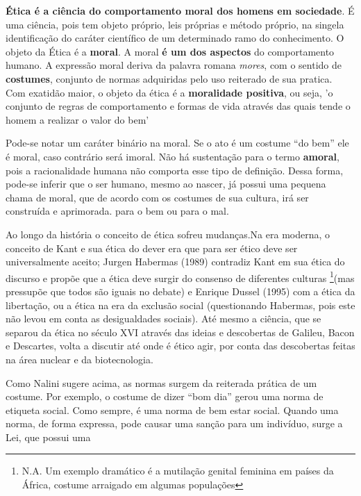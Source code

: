 \documentclass[
	12pt,				%
	openright,			%
	twoside,			%
	a4paper,			%
	chapter=TITLE,		%
	section=TITLE,		%
	subsection=TITLE,	%
	subsubsection=TITLE,%
	spanish,            %
	english,			%
	brazil				%
	]{abntex2}
\begin{document}
\begin{citacao}
	\textbf{Ética é a ciência do comportamento moral dos homens em sociedade}. É uma ciência, pois
	tem objeto próprio, leis próprias e método próprio, na singela identificação do caráter científico de
	um determinado ramo do conhecimento. O objeto da Ética é a \textbf{moral}. A moral \textbf{é um dos aspectos}
	do comportamento humano. A expressão moral deriva da palavra romana \textit{mores}, com o sentido de
	\textbf{costumes}, conjunto de normas adquiridas pelo uso reiterado de sua pratica.\\
	Com exatidão maior, o objeto da ética é a \textbf{moralidade positiva}, ou seja, 'o conjunto de
	regras de comportamento e formas de vida através das quais tende o homem a realizar o valor do bem'\cite[p. ~19, grifos do autor]{Nalini}
\end{citacao}
\par
Pode-se notar um caráter binário na moral. Se o ato é um costume “do bem” ele é moral, caso contrário será imoral. Não há sustentação para o termo \textbf{amoral}, pois a racionalidade humana não comporta
esse tipo de definição. Dessa forma, pode-se inferir que o ser humano, mesmo ao nascer, já possui uma pequena chama de moral, que de acordo com os costumes de sua cultura, irá ser construída e aprimorada. para o bem ou para o mal.
\par
Ao longo da história o conceito de ética sofreu mudanças.Na era moderna, o conceito de Kant e sua ética do dever era que para ser ético deve ser universalmente aceito; Jurgen Habermas (1989) contradiz Kant em sua ética do discurso e propõe que a ética deve surgir do consenso de diferentes culturas \footnote{N.A. Um exemplo dramático é a mutilação genital feminina em países da África, costume arraigado em algumas populações}(mas pressupõe que todos são iguais no debate) e Enrique Dussel (1995) com a ética da libertação, ou a ética na era da exclusão social (questionando Habermas, pois este não levou em conta as desigualdades sociais). Até mesmo a ciência, que se separou da ética no século XVI através das ideias e descobertas de Galileu, Bacon e Descartes, volta a discutir até onde é ético agir, por conta das descobertas feitas na área nuclear e da biotecnologia.
\par
Como Nalini sugere acima, as normas surgem da reiterada prática de um costume. Por exemplo, o costume de
dizer “bom dia” gerou uma norma de etiqueta social. Como sempre, é uma norma de bem estar social. Quando
uma norma, de forma expressa, pode causar uma sanção para um indivíduo, surge a Lei, que possui uma
\end{document}
